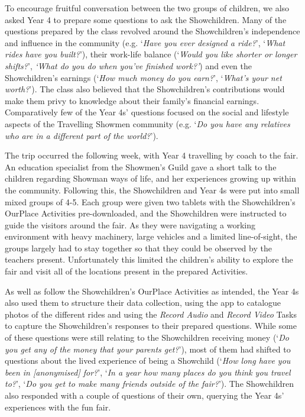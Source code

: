 \documentclass[,hyphens]{sigchi}
\begin{document}
To encourage fruitful conversation between the two groups of children, we also asked Year 4 to prepare some questions to ask the Showchildren. Many of the questions prepared by the class revolved around the Showchildren's independence and influence in the community (e.g. `\textit{Have you ever designed a ride?}', `\textit{What rides have you built?}'), their work-life balance (`\textit{Would you like shorter or longer shifts?}', \textit{`What do you do when you've finished work?'}) and even the Showchildren's earnings (`\textit{How much money do you earn?}', `\textit{What's your net worth?}'). The class also believed that the Showchildren's contributions would make them privy to knowledge about their family's financial earnings. Comparatively few of the Year 4s' questions focused on the social and lifestyle aspects of the Travelling Showmen community (e.g. `\textit{Do you have any relatives who are in a different part of the world?}').

The trip occurred the following week, with Year 4 travelling by coach to the fair. An education specialist from the Showmen's Guild gave a short talk to the children regarding Showman ways of life, and her experiences growing up within the community. Following this, the Showchildren and Year 4s were put into small mixed groups of 4-5. Each group were given two tablets with the Showchildren's OurPlace Activities pre-downloaded, and the Showchildren were instructed to guide the visitors around the fair. As they were navigating a working environment with heavy machinery, large vehicles and a limited line-of-sight, the groups largely had to stay together so that they could be observed by the teachers present. Unfortunately this limited the children's ability to explore the fair and visit all of the locations present in the prepared Activities.

As well as follow the Showchildren's OurPlace Activities as intended, the Year 4s also used them to structure their data collection, using the app to catalogue photos of the different rides and using the \textit{Record Audio} and \textit{Record Video} Tasks to capture the Showchildren's responses to their prepared questions. While some of these questions were still relating to the Showchildren receiving money (`\textit{Do you get any of the money that your parents get?}'), most of them had shifted to questions about the lived experience of being a Showchild (`\textit{How long have you been in [anonymised] for?}', `\textit{In a year how many places do you think you travel to?}', `\textit{Do you get to make many friends outside of the fair?}'). The Showchildren also responded with a couple of questions of their own, querying the Year 4s' experiences with the fun fair.
\end{document}

